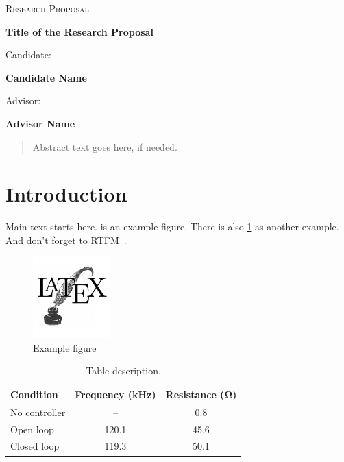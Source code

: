 \documentclass[english, a4paper, 11pt]{article}
\begin{document}
\thispagestyle{unicamp}

\begin{center}

\null\vfill

{\scshape\large Research Proposal\par}

\baselineskip

{\LARGE\bfseries Title of the Research Proposal\par}

\baselineskip

Candidate:\\[1ex]
{\large\bfseries Candidate Name\par}

\baselineskip

Advisor:\\[1ex]
{\large\bfseries Advisor Name\par}

\end{center}

\vfill

\begin{abstract}
Abstract text goes here, if needed.
\end{abstract}

\newpage

\onehalfspacing

\section{Introduction}

Main text starts here.
 is an example figure.
There is also \cref{tab:example} as another example.
And don't forget to \gls{RTFM}~\cite{oetiker_not_2015, latex_wikibook}.

\begin{figure}[htp]
\centering
\includegraphics[width=3cm]{example}
\caption{Example figure}
\label{fig:example}
\end{figure}

\begin{table}[hbp]
\centering
\caption{Table description.}
\label{tab:example}
\begin{tabular}{lcc}
\toprule
Condition & Frequency (\si{kHz}) & Resistance (\si{\ohm}) \\
\midrule
No controller & -- & \num{0.8} \\
Open loop & \num{120.1} & \num{45.6} \\
Closed loop & \num{119.3} & \num{50.1} \\
\bottomrule
\end{tabular}
\end{table}
\end{document}
